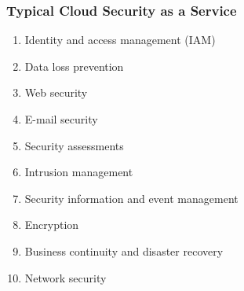 \subsubsection{Typical Cloud Security as a Service}
\begin{enumerate}
    \item Identity and access management (IAM)
    \item Data loss prevention
    \item Web security
    \item E-mail security
    \item Security assessments
    \item Intrusion management
    \item Security information and event management
    \item Encryption
    \item Business continuity and disaster recovery
    \item Network security
\end{enumerate}